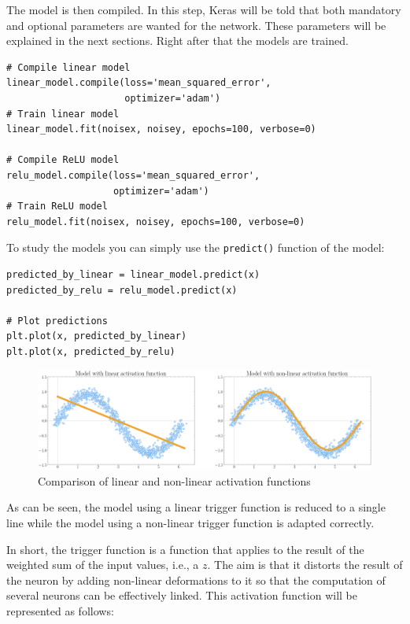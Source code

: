 The model is then compiled. In this step, Keras will be told that both mandatory and optional parameters are wanted for the network. These parameters will be explained in the next sections. Right after that the models are trained.
\begin{verbatim}
# Compile linear model
linear_model.compile(loss='mean_squared_error', 
                     optimizer='adam')
# Train linear model
linear_model.fit(noisex, noisey, epochs=100, verbose=0)

# Compile ReLU model
relu_model.compile(loss='mean_squared_error',
                   optimizer='adam')
# Train ReLU model
relu_model.fit(noisex, noisey, epochs=100, verbose=0)
\end{verbatim}

To study the models you can simply use the \small{\verb|predict()|} \normalsize function of the model:
\begin{verbatim}
predicted_by_linear = linear_model.predict(x)
predicted_by_relu = relu_model.predict(x)

# Plot predictions
plt.plot(x, predicted_by_linear)
plt.plot(x, predicted_by_relu)
\end{verbatim}

\begin{figure}[H]
    \centering
    \includegraphics[width=15cm]{images/state-of-art/activation-functions/sin_activation_function.png}
    \caption{Comparison of linear and non-linear activation functions}
    \label{fig:basicneuron}
\end{figure}

As can be seen, the model using a linear trigger function is reduced to a single line while the model using a non-linear trigger function is adapted correctly.
\newline


In short, the trigger function is a function that applies to the result of the weighted sum of the input values, i.e., a $z$. The aim is that it distorts the result of the neuron by adding non-linear deformations to it so that the computation of several neurons can be effectively linked. This activation function will be represented as follows:

